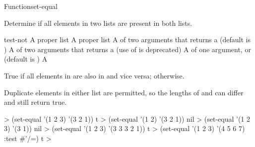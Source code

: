 \documentclass[10pt,twoside,english,pdftex]{article}
\begin{document}
\begin{functiondoc}{Function}{set-equal}{
     
    \returns{} }

\fnsyntax

\fnpurpose Determine if all elements in two lists are present in both lists.

\fnpackage {}

\fnmodule {}

\fnargs
\begin{args}{test-not}
\arg[list-1] A proper list
\arg[list-2] A proper list
\arg[test] A  of two arguments that returns a
 (default is ) 
 A  of two arguments that returns a
 (use of  is deprecated)
\arg[key] A  of one argument, or \nil{} (default is \nil)
\arg[boolean] A 
\end{args}

\fnreturns True if all elements in  are also in
 and vice versa; \nil{} otherwise.

\fndescription Duplicate elements in either list are permitted, so the lengths
of  and  can differ and still return
true.

\fnexamples
%
\W\supp
\begin{example}
  > (set-equal '(1 2 3) '(3 2 1))
  t
  > (set-equal '(1 2) '(3 2 1))
  nil\goodpagebreak
  > (set-equal '(1 2 3) '(3 1))
  nil
  > (set-equal '(1 2 3) '(3 3 3 2 1))
  t
  > (set-equal '(1 2 3) '(4 5 6 7) :test #'/=)
  t
  >
\end{example}

\end{functiondoc}

\end{document}
